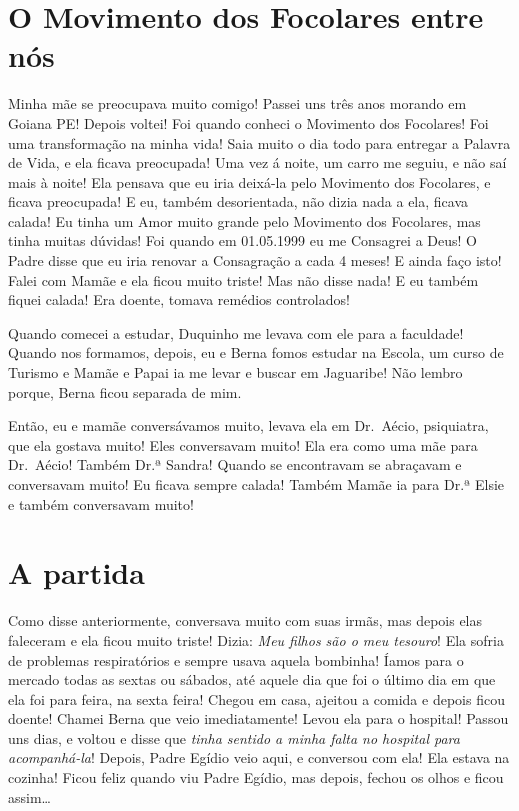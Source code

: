 \documentclass[
  brazil,
  a6paper,
  oneside,
  landscape,
  14pt]{scrbook}
\begin{document}
\hypertarget{o-movimento-dos-focolares-entre-nuxf3s}{%
\section{O Movimento dos Focolares entre
nós}\label{o-movimento-dos-focolares-entre-nuxf3s}}

Minha mãe se preocupava muito comigo! Passei uns três anos morando em
Goiana PE! Depois voltei! Foi quando conheci o Movimento dos Focolares!
Foi uma transformação na minha vida! Saia muito o dia todo para entregar
a Palavra de Vida, e ela ficava preocupada! Uma vez á noite, um carro me
seguiu, e não saí mais à noite! Ela pensava que eu iria deixá-la pelo
Movimento dos Focolares, e ficava preocupada! E eu, também desorientada,
não dizia nada a ela, ficava calada! Eu tinha um Amor muito grande pelo
Movimento dos Focolares, mas tinha muitas dúvidas! Foi quando em
01.05.1999 eu me Consagrei a Deus! O Padre disse que eu iria renovar a
Consagração a cada 4 meses! E ainda faço isto! Falei com Mamãe e ela
ficou muito triste! Mas não disse nada! E eu também fiquei calada! Era
doente, tomava remédios controlados!

Quando comecei a estudar, Duquinho me levava com ele para a faculdade!
Quando nos formamos, depois, eu e Berna fomos estudar na Escola, um
curso de Turismo e Mamãe e Papai ia me levar e buscar em Jaguaribe! Não
lembro porque, Berna ficou separada de mim.

Então, eu e mamãe conversávamos muito, levava ela em Dr.~Aécio,
psiquiatra, que ela gostava muito! Eles conversavam muito! Ela era como
uma mãe para Dr.~Aécio! Também Dr.ª Sandra! Quando se encontravam se
abraçavam e conversavam muito! Eu ficava sempre calada! Também Mamãe ia
para Dr.ª Elsie e também conversavam muito!

\hypertarget{a-partida}{%
\section{A partida}\label{a-partida}}

Como disse anteriormente, conversava muito com suas irmãs, mas depois
elas faleceram e ela ficou muito triste! Dizia: \emph{Meu filhos são o
meu tesouro}! Ela sofria de problemas respiratórios e sempre usava
aquela bombinha! Íamos para o mercado todas as sextas ou sábados, até
aquele dia que foi o último dia em que ela foi para feira, na sexta
feira! Chegou em casa, ajeitou a comida e depois ficou doente! Chamei
Berna que veio imediatamente! Levou ela para o hospital! Passou uns
dias, e voltou e disse que \emph{tinha sentido a minha falta no hospital
para acompanhá-la}! Depois, Padre Egídio veio aqui, e conversou com ela!
Ela estava na cozinha! Ficou feliz quando viu Padre Egídio, mas depois,
fechou os olhos e ficou assim\ldots{}
\end{document}
